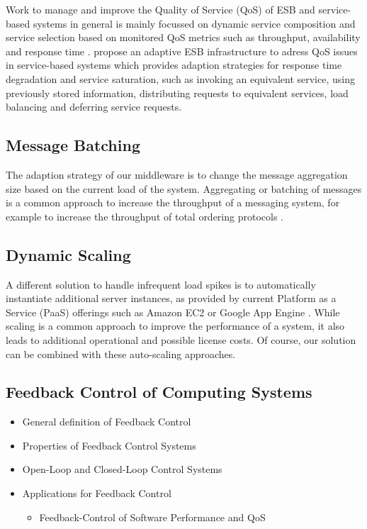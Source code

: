 Work to manage and improve the Quality of Service (QoS) of ESB and service-based systems in general is mainly focussed on dynamic service composition and service selection based on monitored QoS metrics such as throughput, availability and response time \citep{Calinescu:2011aa}. \cite{Gonzalez:2011} propose an adaptive ESB infrastructure to adress QoS issues in service-based systems which provides adaption strategies for response time degradation and service saturation, such as invoking an equivalent service, using previously stored information, distributing requests to equivalent services, load balancing and deferring service requests.

\subsection{Message Batching}
The adaption strategy of our middleware is to change the message aggregation size based on the current load of the system. Aggregating or batching of messages is a common approach to increase the throughput of a messaging system, for example to increase the throughput of total ordering protocols \citep{Friedman:1997aa} \citep{Friedman:2006aa} \citep{Romano:2012aa} \citep{Didona:2012aa}.


\subsection{Dynamic Scaling}
A different solution to handle infrequent load spikes is to automatically instantiate additional server instances, as provided by current Platform as a Service (PaaS) offerings such as Amazon EC2 \citep{ec2_autoscaling} or Google App Engine \citep{google_cloud_autoscaling}. While scaling is a common approach to improve the performance of a system, it also leads to additional operational and possible license costs. Of course, our solution can be combined with these auto-scaling approaches.

\subsection{Feedback Control of Computing Systems}

\begin{itemize}
	\item General definition of Feedback Control
	\item Properties of Feedback Control Systems
	\item Open-Loop and Closed-Loop Control Systems
	\item Applications for Feedback Control
	\begin{itemize}
		\item Feedback-Control of Software Performance and \ac{QoS} 
	\end{itemize}
\end{itemize}

